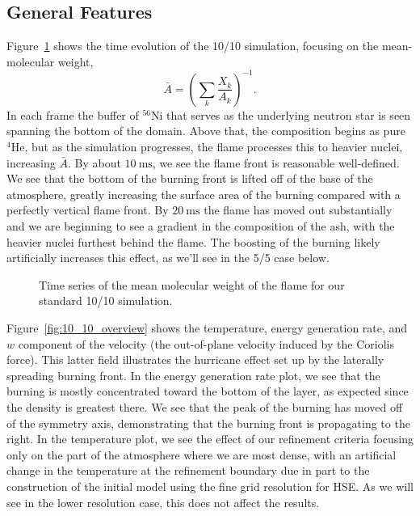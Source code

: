 \documentclass[preprint,times,tighten]{aastex63}
\newcommand{\isot}[2]{$^{#2}\mathrm{#1}$}
\begin{document}
\subsection{General Features}

Figure~\ref{fig:time_series} shows the time evolution of the 10/10
simulation, focusing on the mean-molecular weight,
\begin{equation}
\bar{A} = \left ( \sum_k \frac{X_k}{A_k} \right )^{-1}.
\end{equation}
In each frame the buffer of \isot{Ni}{56} that serves as the
underlying neutron star is seen spanning the bottom of the domain.
Above that, the composition begins as pure \isot{He}{4}, but as the
simulation progresses, the flame processes this to heavier nuclei,
increasing $\bar{A}$.  By about $10~\mbox{ms}$, we see the flame front
is reasonable well-defined.  We see that the bottom of the burning
front is lifted off of the base of the atmosphere, greatly increasing
the surface area of the burning compared with a perfectly vertical
flame front.  By $20~\mbox{ms}$ the flame has moved out substantially
and we are beginning to see a gradient in the composition of the ash,
with the heavier nuclei furthest behind the flame.  The boosting of
the burning likely artificially increases this effect, as we'll see in the 5/5 case below.


\begin{figure}[t]
\centering
{}
\caption{\label{fig:time_series} Time series of the mean molecular weight of the 
flame for our standard 10/10 simulation.}
\end{figure}

Figure~\ref{fig:10_10_overview} shows the temperature, energy
generation rate, and $w$ component of the velocity (the out-of-plane
velocity induced by the Coriolis force).  This latter field
illustrates the hurricane effect set up by the laterally spreading
burning front.  In the energy generation rate plot, we see that the
burning is mostly concentrated toward the bottom of the layer, as
expected since the density is greatest there.  We see that the peak of
the burning has moved off of the symmetry axis, demonstrating that the
burning front is propagating to the right.  In the temperature plot,
we see the effect of our refinement criteria focusing only on the part of
the atmosphere where we are most dense, with an artificial change in the
temperature at the refinement boundary due in part to the construction
of the initial model using the fine grid resolution for HSE.  As we will see in the lower resolution case, this does not
affect the results.
\end{document}
